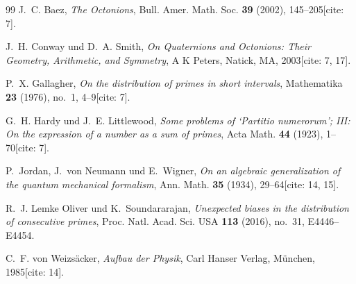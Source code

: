 \documentclass[11pt,a4paper]{article}
\theoremstyle{definition}
\theoremstyle{remark}
\begin{document}
\begin{thebibliography}{99}
J.~C. Baez, \emph{The Octonions}, Bull. Amer. Math. Soc. \textbf{39} (2002), 145--205[cite: 7].

J.~H. Conway und D.~A. Smith, \emph{On Quaternions and Octonions: Their Geometry, Arithmetic, and Symmetry}, A K Peters, Natick, MA, 2003[cite: 7, 17].

P.~X. Gallagher, \emph{On the distribution of primes in short intervals}, Mathematika \textbf{23} (1976), no.~1, 4--9[cite: 7].

G.~H. Hardy und J.~E. Littlewood, \emph{Some problems of `Partitio numerorum'; III: On the expression of a number as a sum of primes}, Acta Math. \textbf{44} (1923), 1--70[cite: 7].

P.~Jordan, J.~von Neumann und E.~Wigner, \emph{On an algebraic generalization of the quantum mechanical formalism}, Ann. Math. \textbf{35} (1934), 29--64[cite: 14, 15].

R.~J. Lemke Oliver und K.~Soundararajan, \emph{Unexpected biases in the distribution of consecutive primes}, Proc. Natl. Acad. Sci. USA \textbf{113} (2016), no.~31, E4446--E4454.

C.~F. von Weizsäcker, \emph{Aufbau der Physik}, Carl Hanser Verlag, München, 1985[cite: 14].

\end{thebibliography}
\end{document}
